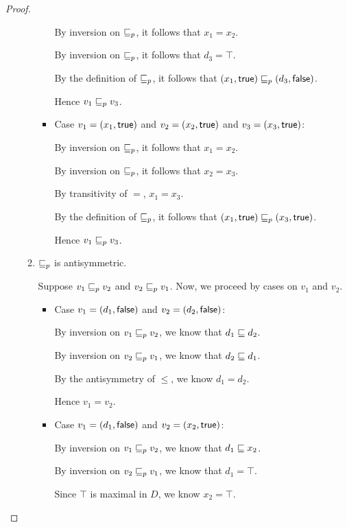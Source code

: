 \begin{proof}
\begin{enumerate}
\begin{enumerate}
\begin{itemize}
        By inversion on $\sqsubseteq_p$, it follows that $x_1 = x_2$.

        By inversion on $\sqsubseteq_p$, it follows that $d_3 = \top$.

        By the definition of $\sqsubseteq_p$, it follows that
        $(x_1, \textsf{true}) \sqsubseteq_p (d_3, \textsf{false})$.

        Hence $v_1 \sqsubseteq_p v_3$. 

      \item Case $v_1 = (x_1, \textsf{true})$ and $v_2 =
        (x_2, \textsf{true})$ and $v_3 =
        (x_3, \textsf{true})$:

        By inversion on $\sqsubseteq_p$, it follows that $x_1 = x_2$.

        By inversion on $\sqsubseteq_p$, it follows that $x_2 = x_3$.

        By transitivity of $=$, $x_1 = x_3$.

        By the definition of $\sqsubseteq_p$, it follows that
        $(x_1, \textsf{true}) \sqsubseteq_p (x_3, \textsf{true})$.

        Hence $v_1 \sqsubseteq_p v_3$. 
        
      \end{itemize}

    \item $\sqsubseteq_p$ is antisymmetric. 

      Suppose $v_1 \sqsubseteq_p v_2$ and $v_2 \sqsubseteq_p v_1$. Now, we proceed by
      cases on $v_1$ and $v_2$.
      \begin{itemize}
      \item Case $v_1 = (d_1, \textsf{false})$ and $v_2 =
        (d_2, \textsf{false})$:
        
        By inversion on $v_1 \sqsubseteq_p v_2$, we know that $d_1 \sqsubseteq
        d_2$.

        By inversion on $v_2 \sqsubseteq_p v_1$, we know that $d_2 \sqsubseteq
        d_1$.

        By the antisymmetry of $\leq$, we know $d_1 = d_2$.

        Hence $v_1 = v_2$. 

      \item Case $v_1 = (d_1, \textsf{false})$ and $v_2 =
        (x_2, \textsf{true})$:

        By inversion on $v_1 \sqsubseteq_p v_2$, we know that $d_1 \sqsubseteq x_2$.

        By inversion on $v_2 \sqsubseteq_p v_1$, we know that $d_1 = \top$.

        Since $\top$ is maximal in $D$, we know $x_2 = \top$.


\end{itemize}
\end{enumerate}
\end{enumerate}
\end{proof}
